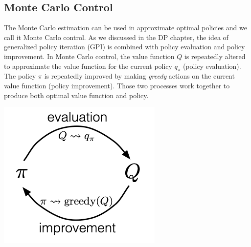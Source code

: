 \subsection{Monte Carlo Control}

\begin{minipage}[c]{0.8\textwidth}
    The Monte Carlo estimation can be used in approximate optimal policies and we call it Monte Carlo control. As we discussed in the DP chapter, the idea of generalized policy iteration (GPI) is combined with policy evaluation and policy improvement. In Monte Carlo control, the value function $Q$ is repeatedly altered to approximate the value function for the current policy $q_\pi$ (policy evaluation). The policy $\pi$ is repeatedly improved by making \emph{greedy} actions on the current value function (policy improvement). Those two processes work together to produce both optimal value function and policy.
\end{minipage}
\hfill
\begin{minipage}[c]{0.2\textwidth}
    \includegraphics[height = 1.3\textwidth]{Figures/MC_GPI.png}
\end{minipage}


